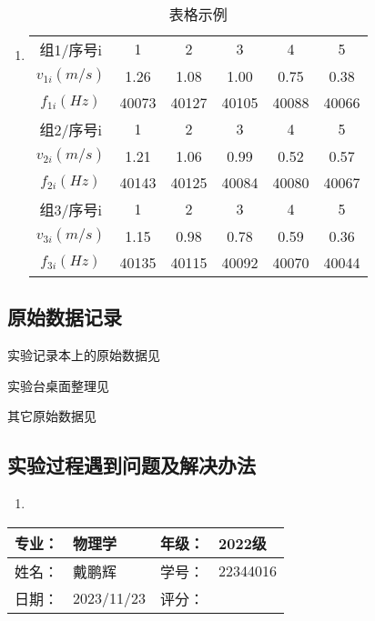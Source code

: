 \documentclass[dvipsnames, svgnames,a4paper,11pt]{article}
\begin{document}
	\subsubsection{}
	\begin{enumerate}
		\item \begin{table}[h]
			\centering
			\caption{表格示例}
			\label{tab:tab1}
			\begin{tabular}{|c|c|c|c|c|c|}
				\hline
				组1/序号i & 1 & 2 & 3 & 4 & 5 \\
				$v_{1i}(m/s)$ & 1.26 & 1.08 & 1.00 & 0.75 & 0.38 \\
				$f_{1i}(Hz)$ & 40073 & 40127 & 40105 & 40088 & 40066 \\
				\hline
				组2/序号i & 1 & 2 & 3 & 4 & 5 \\
				$v_{2i}(m/s)$ & 1.21 & 1.06 & 0.99 & 0.52 & 0.57 \\
				$f_{2i}(Hz)$ & 40143 & 40125 & 40084 & 40080 & 40067 \\
				\hline
				组3/序号i & 1 & 2 & 3 & 4 & 5 \\
				$v_{3i}(m/s)$ & 1.15 & 0.98 & 0.78 & 0.59 & 0.36 \\
				$f_{3i}(Hz)$ & 40135 & 40115 & 40092 & 40070 & 40044 \\
				\hline
			\end{tabular}
		\end{table}		
	\end{enumerate}
	
	
	\clearpage
	\subsection{原始数据记录}
	实验记录本上的原始数据见%
	
	实验台桌面整理见%
	
	其它原始数据见%
	
	\subsection{实验过程遇到问题及解决办法}
	\begin{enumerate}
		\item 
	\end{enumerate}
	
	
	
	\clearpage
	
	\begin{table}
		\renewcommand\arraystretch{1.7}
		\begin{tabularx}{\textwidth}{|X|X|X|X|}
			\hline
			专业：& 物理学 &年级：& 2022级\\
			\hline
			姓名： & 戴鹏辉 & 学号：& 22344016\\
			\hline
			日期：& 2023/11/23 & 评分： &\\
			\hline
		\end{tabularx}
	\end{table}
	
\end{document}
